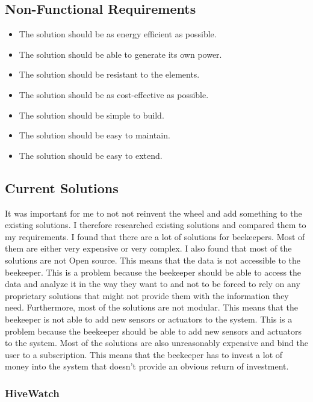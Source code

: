 \subsection{Non-Functional Requirements}
\begin{itemize}
    \item The solution should be as energy efficient as possible.
    \item The solution should be able to generate its own power.
    \item The solution should be resistant to the elements.
    \item The solution should be as cost-effective as possible.
    \item The solution should be simple to build.
    \item The solution should be easy to maintain.
    \item The solution should be easy to extend.
\end{itemize}

\newpage
\subsection{Current Solutions}
It was important for me to not not reinvent the wheel and add something to the existing solutions. I therefore researched existing solutions and compared them to my requirements. I found that there are a lot of solutions for beekeepers. Most of them are either very expensive or very complex. I also found that most of the solutions are not \gls{Open source}. This means that the data is not accessible to the beekeeper. This is a problem because the beekeeper should be able to access the data and analyze it in the way they want to and not to be forced to rely on any proprietary solutions that might not provide them with the information they need. Furthermore, most of the solutions are not \gls{modular}. This means that the beekeeper is not able to add new \gls{sensors} or \gls{actuators} to the system. This is a problem because the beekeeper should be able to add new sensors and actuators to the system. Most of the solutions are also unreasonably expensive and bind the user to a subscription. This means that the beekeeper has to invest a lot of money into the system that doesn't provide an obvious return of investment.

\newpage
\subsubsection{HiveWatch}

